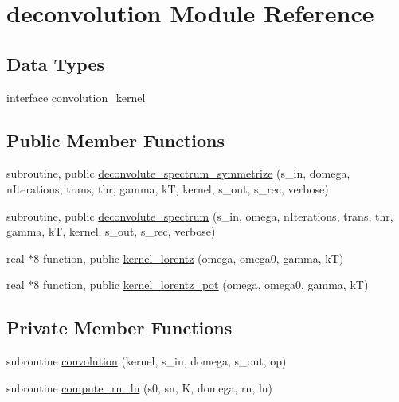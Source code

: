 \hypertarget{classdeconvolution}{\section{deconvolution Module Reference}
\label{classdeconvolution}
}
\subsection*{Data Types}
\begin{DoxyCompactItemize}
\item 
interface \hyperlink{interfacedeconvolution_1_1convolution__kernel}{convolution\-\_\-kernel}
\end{DoxyCompactItemize}
\subsection*{Public Member Functions}
\begin{DoxyCompactItemize}
\item 
subroutine, public \hyperlink{classdeconvolution_a0e309ef87c6e2a604bf58bcf2c3a9557}{deconvolute\-\_\-spectrum\-\_\-symmetrize} (s\-\_\-in, domega, n\-Iterations, trans, thr, gamma, k\-T, kernel, s\-\_\-out, s\-\_\-rec, verbose)
\item 
subroutine, public \hyperlink{classdeconvolution_aebbb7f3c86c0fb2e772ad75c4797f494}{deconvolute\-\_\-spectrum} (s\-\_\-in, omega, n\-Iterations, trans, thr, gamma, k\-T, kernel, s\-\_\-out, s\-\_\-rec, verbose)
\item 
real $\ast$8 function, public \hyperlink{classdeconvolution_a0cc97e555b69a5d094ec95767b1cc738}{kernel\-\_\-lorentz} (omega, omega0, gamma, k\-T)
\item 
real $\ast$8 function, public \hyperlink{classdeconvolution_a3d66d542fdad4d406e2bc1cd48e21835}{kernel\-\_\-lorentz\-\_\-pot} (omega, omega0, gamma, k\-T)
\end{DoxyCompactItemize}
\subsection*{Private Member Functions}
\begin{DoxyCompactItemize}
\item 
subroutine \hyperlink{classdeconvolution_afa72e3081738c9001b04859834b4b09b}{convolution} (kernel, s\-\_\-in, domega, s\-\_\-out, op)
\item 
subroutine \hyperlink{classdeconvolution_ab0555563a13a1f0f4a5784d8bd04630e}{compute\-\_\-rn\-\_\-ln} (s0, sn, K, domega, rn, ln)
\end{DoxyCompactItemize}


